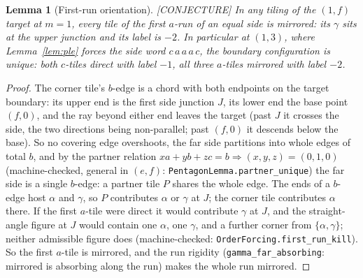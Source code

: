 \documentclass[11pt,reqno]{amsart}
\theoremstyle{plain}
\newtheorem{lemma}[theorem]{Lemma}
\theoremstyle{definition}
\newcommand{\lab}[1]{\hfill\textnormal{\footnotesize\textsc{[#1]}}}
\begin{document}
\begin{lemma}[First-run orientation]\label{lem:firstrun}\lab{CONJECTURE}
In any tiling of the $(1,f)$ target at $m=1$, every tile of the first $a$-run of an equal side is
mirrored: its $\gamma$ sits at the upper junction and its label is $-2$. In particular at $(1,3)$,
where Lemma~\ref{lem:ple} forces the side word $c\,a\,a\,a\,c$, the boundary configuration is
\emph{unique}: both $c$-tiles direct with label $-1$, all three $a$-tiles mirrored with label $-2$.
\end{lemma}
\begin{proof}
The corner tile's $b$-edge is a chord with both endpoints on the target boundary: its upper end is
the first side junction $J$, its lower end the base point $(f,0)$, and the ray beyond either end
leaves the target (past $J$ it crosses the side, the two directions being non-parallel; past
$(f,0)$ it descends below the base). So no covering edge overshoots, the far side partitions into
whole edges of total $b$, and by the partner relation $xa+yb+zc=b\Rightarrow(x,y,z)=(0,1,0)$
(machine-checked, general in $(e,f)$: \texttt{PentagonLemma.partner\_unique}) the far side is a
single $b$-edge: a partner tile $P$ shares the whole edge. The ends of a $b$-edge host $\alpha$ and
$\gamma$, so $P$ contributes $\alpha$ or $\gamma$ at $J$; the corner tile contributes $\alpha$
there. If the first $a$-tile were direct it would contribute $\gamma$ at $J$, and the straight-angle
figure at $J$ would contain one $\alpha$, one $\gamma$, and a further corner from
$\{\alpha,\gamma\}$; neither admissible figure does
(machine-checked: \texttt{OrderForcing.first\_run\_kill}). So the first $a$-tile is mirrored, and
the run rigidity (\texttt{gamma\_far\_absorbing}: mirrored is absorbing along the run) makes the
whole run mirrored.
\end{proof}
\end{document}
